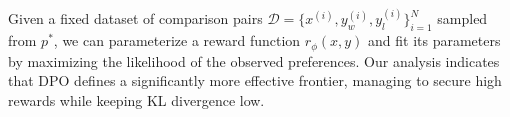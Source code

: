 Given a fixed dataset of comparison pairs $\mathcal{D}=\bigl\{x^{(i)}, y_w^{(i)}, y_l^{(i)}\bigr\}_{i=1}^N$ sampled from $p^*$, we can parameterize a reward function $r_{\phi}(x, y)$ and fit its parameters by maximizing the likelihood of the observed preferences. Our analysis indicates that DPO defines a significantly more effective frontier, managing to secure high rewards while keeping KL divergence low. 
\begin{abstract}
Large-scale unsupervised language models (LMs) acquire extensive general knowledge and develop some reasoning abilities, yet exerting fine-grained control over their outputs remains challenging due to the purely unsupervised setup of their training regimes. Our analysis covers three comparison pairs spanning a range of sample qualities: the top-performing method (DPO, temp. \section{Preliminaries}\label{section:prelims}


\end{abstract}

